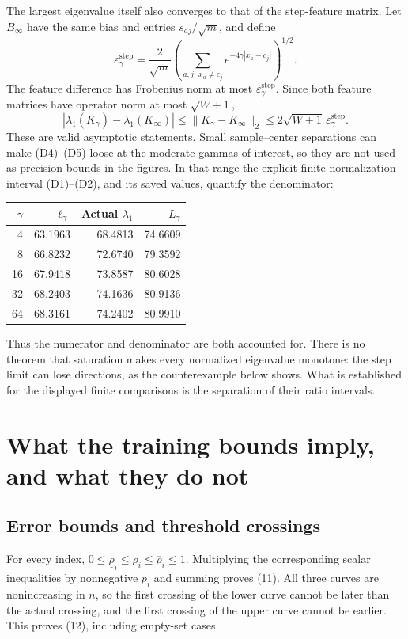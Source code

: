 \documentclass[11pt]{article}
\begin{document}
The largest eigenvalue itself also converges to that of the step-feature matrix. Let \(B_\infty\) have the same bias and entries \(s_{aj}/\sqrt m\), and define
\[
\varepsilon_\gamma^{\mathrm{step}}
=\frac2{\sqrt m}\left(\sum_{a,j:\,x_a\ne c_j}
 e^{-4\gamma|x_a-c_j|}\right)^{1/2}.
\]
The feature difference has Frobenius norm at most \(\varepsilon_\gamma^{\mathrm{step}}\). Since both feature matrices have operator norm at most \(\sqrt{W+1}\),
\[
|\lambda_1(K_\gamma)-\lambda_1(K_\infty)|
\le\|K_\gamma-K_\infty\|_2
\le2\sqrt{W+1}\,\varepsilon_\gamma^{\mathrm{step}}.
\tag{D5}
\]
These are valid asymptotic statements. Small sample--center separations can make (D4)--(D5) loose at the moderate gammas of interest, so they are not used as precision bounds in the figures. In that range the explicit finite normalization interval (D1)--(D2), and its saved values, quantify the denominator:
\begin{center}\small
\begin{tabular}{rrrr}
\toprule
\(\gamma\) & \(\ell_\gamma\) & Actual \(\lambda_1\) & \(L_\gamma\)\\
\midrule
4 & 63.1963 & 68.4813 & 74.6609\\
8 & 66.8232 & 72.6740 & 79.3592\\
16 & 67.9418 & 73.8587 & 80.6028\\
32 & 68.2403 & 74.1636 & 80.9136\\
64 & 68.3161 & 74.2402 & 80.9910\\
\bottomrule
\end{tabular}
\end{center}
Thus the numerator and denominator are both accounted for. There is no theorem that saturation makes every normalized eigenvalue monotone: the step limit can lose directions, as the counterexample below shows. What is established for the displayed finite comparisons is the separation of their ratio intervals.

\section{What the training bounds imply, and what they do not}

\subsection{Error bounds and threshold crossings}

For every index, \(0\le\underline\rho_i\le\rho_i\le\overline\rho_i\le1\). Multiplying the corresponding scalar inequalities by nonnegative \(p_i\) and summing proves (11). All three curves are nonincreasing in \(n\), so the first crossing of the lower curve cannot be later than the actual crossing, and the first crossing of the upper curve cannot be earlier. This proves (12), including empty-set cases.
\end{document}
